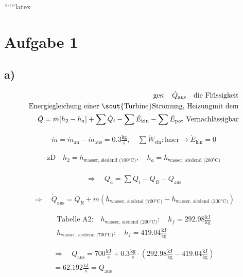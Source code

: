 
``````latex


\section*{Aufgabe 1}

\subsection*{a)}

\begin{align*}
\text{ges:} \quad \dot{Q}_{\text{aus}} \quad \text{die Flüssigkeit} \\
\text{Energiegleichung einer } \text{\sout{Turbine}} \text{Strömung, Heizung} \text{mit dem} \\
\dot{Q} = \dot{m} [h_2 - h_a] + \sum \dot{Q}_i - \sum \dot{E}_{\text{kin}} - \sum \dot{E}_{\text{pot}} \text{ Vernachlässigbar}
\end{align*}

\begin{align*}
\dot{m} = \dot{m}_{\text{an}} - \dot{m}_{\text{aus}} = 0.3 \frac{\text{kg}}{\text{s}}, \quad \sum \dot{W}_{\text{ein}}: \text{laser} \rightarrow \dot{E}_{\text{kin}} = 0
\end{align*}

\begin{align*}
\text{zD} \quad h_2 = h_{\text{wasser, siedend (700°C)}}, \quad h_a = h_{\text{wasser, siedend (200°C)}}
\end{align*}

\begin{align*}
\Rightarrow \quad \dot{Q}_a = \sum \dot{Q}_i - \dot{Q}_R - \dot{Q}_{\text{aus}}
\end{align*}

\begin{align*}
\Rightarrow \quad \dot{Q}_{\text{aus}} = \dot{Q}_R + \dot{m} (h_{\text{wasser, siedend (700°C)}} - h_{\text{wasser, siedend (200°C)}})
\end{align*}

\begin{align*}
\text{Tabelle A2:} \quad h_{\text{wasser, siedend (200°C)}}: \quad h_f = 292.98 \frac{\text{kJ}}{\text{kg}} \\
h_{\text{wasser, siedend (700°C)}}: \quad h_f = 419.04 \frac{\text{kJ}}{\text{kg}}
\end{align*}

\begin{align*}
\Rightarrow \quad \dot{Q}_{\text{aus}} = 700 \frac{\text{kJ}}{\text{s}} + 0.3 \frac{\text{kg}}{\text{s}} \cdot (292.98 \frac{\text{kJ}}{\text{kg}} - 419.04 \frac{\text{kJ}}{\text{kg}}) \\
= 62.192 \frac{\text{kJ}}{\text{s}} = \dot{Q}_{\text{aus}}
\end{align*}

